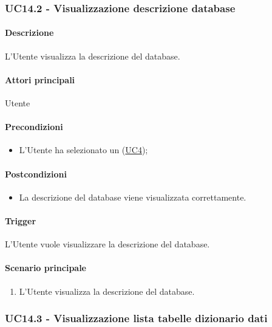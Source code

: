 \subsubsection{UC14.2 - Visualizzazione descrizione database}\label{UC14point2}
\paragraph*{Descrizione}
L'Utente visualizza la descrizione del database.

\paragraph*{Attori principali}
Utente

\paragraph*{Precondizioni}
\begin{itemize}
  \item L'Utente ha selezionato un  (\hyperref[UC4]{UC4});
\end{itemize}

\paragraph*{Postcondizioni}
\begin{itemize}
  \item La descrizione del database viene visualizzata correttamente.
\end{itemize}

\paragraph*{Trigger}
L'Utente vuole visualizzare la descrizione del database.

\paragraph*{Scenario principale}
\begin{enumerate}
  \item L'Utente visualizza la descrizione del database.
\end{enumerate}


\subsubsection{UC14.3 - Visualizzazione lista tabelle dizionario dati}\label{UC14point3}
